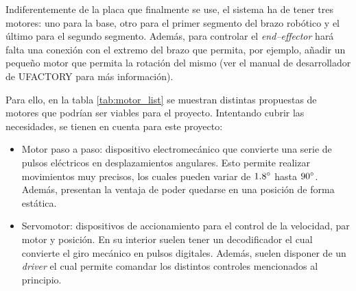 Indiferentemente de la placa que finalmente se use, el sistema ha de tener tres motores: uno para la base, otro para el primer segmento del brazo robótico y el último para el segundo segmento. Además, para controlar el \textit{end--effector} hará falta una conexión con el extremo del brazo que permita, por ejemplo, añadir un pequeño motor que permita la rotación del mismo (ver el manual de desarrollador de UFACTORY para más información).

Para ello, en la tabla \ref{tab:motor_list} se muestran distintas propuestas de motores que podrían ser viables para el proyecto. Intentando cubrir las necesidades, se tienen en cuenta para este proyecto:

\begin{itemize}
    \item Motor paso a paso: dispositivo electromecánico que convierte una serie de pulsos eléctricos en desplazamientos angulares. Esto permite realizar movimientos muy precisos, los cuales pueden variar de $1.8\degree$ hasta $90\degree$. Además, presentan la ventaja de poder quedarse en una posición de forma estática.
    \item Servomotor: dispositivos de accionamiento para el control de la velocidad, par motor y posición. En su interior suelen tener un decodificador el cual convierte el giro mecánico en pulsos digitales. Además, suelen disponer de un \textit{driver} el cual permite comandar los distintos controles mencionados al principio.
\end{itemize}

